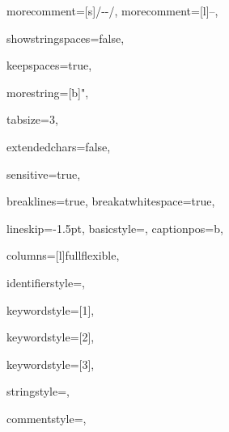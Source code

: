 {%
morecomment=[s]{/-}{-/},
morecomment=[l]{--},

showstringspaces=false,

keepspaces=true,

morestring=[b]{"},

tabsize=3,

extendedchars=false,

sensitive=true,

breaklines=true,
breakatwhitespace=true,

lineskip={-1.5pt},
basicstyle={\ttfamily},
captionpos=b,

columns=[l]fullflexible,


identifierstyle={\ttfamily\color{black}},

keywordstyle=[1]{\ttfamily\color{keywordcolor}},

keywordstyle=[2]{\ttfamily\color{sortcolor}},

keywordstyle=[3]{\ttfamily\color{errorcolor}},



stringstyle={\ttfamily\color{stringcolor}},

commentstyle={\ttfamily\itshape\color{commentcolor}},

}
